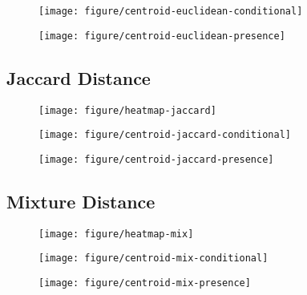\documentclass{article}
\begin{document}
\begin{figure}[ht]
  \centering
  \texttt{[image: figure/centroid-euclidean-conditional]}
  \caption{\label{fig:centroid-euclidean-conditional} }
\end{figure}

\begin{figure}[ht]
  \centering
  \texttt{[image: figure/centroid-euclidean-presence]}
  \caption{\label{fig:centroid-euclidean-conditional} }
\end{figure}


\subsection{Jaccard Distance}

\begin{figure}[ht]
  \centering
  \texttt{[image: figure/heatmap-jaccard]}
  \caption{\label{fig:heatmap-jaccard} }
\end{figure}

\begin{figure}[ht]
  \centering
  \texttt{[image: figure/centroid-jaccard-conditional]}
  \caption{\label{fig:centroid-jaccard-conditional} }
\end{figure}

\begin{figure}[ht]
  \centering
  \texttt{[image: figure/centroid-jaccard-presence]}
  \caption{\label{fig:centroid-jaccard-conditional} }
\end{figure}

\subsection{Mixture Distance}

\begin{figure}[ht]
  \centering
  \texttt{[image: figure/heatmap-mix]}
  \caption{\label{fig:heatmap-mix} }
\end{figure}

\begin{figure}[ht]
  \centering
  \texttt{[image: figure/centroid-mix-conditional]}
  \caption{\label{fig:centroid-mix-conditional} }
\end{figure}

\begin{figure}[ht]
  \centering
  \texttt{[image: figure/centroid-mix-presence]}
  \caption{\label{fig:centroid-mix-conditional} }
\end{figure}



\end{document}
